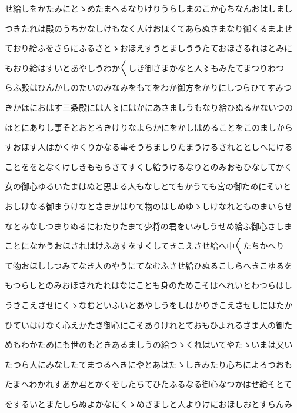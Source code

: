\documentclass[a4paper,11pt,landscape]{ltjtarticle}
\begin{document}
\par\medskip
せ給しをかたみにとゝめたまへるなりけりうらしまのこか心ちなんおはしまし
\par\medskip
つきたれは殿のうちかなしけもなく人けおほくてあらぬさまなり御くるまよせ
\par\medskip
ており給ふをさらにふるさとゝおほえすうとましううたておほさるれはとみに
\par\medskip
もおり給はすいとあやしうわか〱しき御さまかなと人〻もみたてまつりわつ
\par\medskip
らふ殿はひんかしのたいのみなみをもてをわか御方をかりにしつらひてすみつ
\par\medskip
きかほにおはす三条殿には人〻にはかにあさましうもなり給ひぬるかないつの
\par\medskip
ほとにありし事そとおとろきけりなよらかにをかしはめることをこのましから
\par\medskip
すおほす人はかくゆくりかなる事そうちましりたまうけるされととしへにける
\par\medskip
ことををとなくけしきももらさてすくし給うけるなりとのみおもひなしてかく
\par\medskip
女の御心ゆるいたまはぬと思よる人もなしとてもかうても宮の御ためにそいと
\par\medskip
おしけなる御まうけなとさまかはりて物のはしめゆゝしけなれとものまいらせ
\par\medskip
なとみなしつまりぬるにわたりたまて少将の君をいみしうせめ給ふ御心さしま
\par\medskip
ことになかうおほされはけふあすをすくしてきこえさせ給へ中〱たちかへり
\par\medskip
て物おほししつみてなき人のやうにてなむふさせ給ひぬるこしらへきこゆるを
\par\medskip
もつらしとのみおほされたれはなにことも身のためこそはへれいとわつらはし
\par\medskip
うきこえさせにくゝなむといふいとあやしうをしはかりきこえさせしにはたか
\par\medskip
ひていはけなく心えかたき御心にこそありけれとておもひよれるさま人の御た
\par\medskip
めもわかためにも世のもときあるましうの給つゝくれはいてやたゝいまは又い
\par\medskip
たつら人にみなしたてまつるへきにやとあはたゝしきみたり心ちによろつおも
\par\medskip
たまへわかれすあか君とかくをしたちてひたふるなる御心なつかはせ給そとて
\par\medskip
をするいとまたしらぬよかなにくゝめさましと人よりけにおほしおとすらんみ
\end{document}
